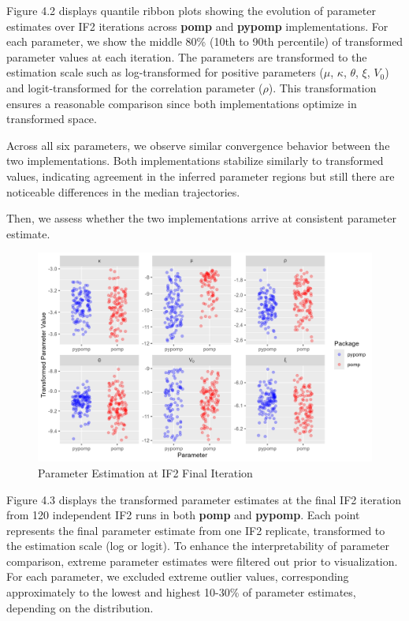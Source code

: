 \documentclass[11pt]{report}
\begin{document}
\newpage
Figure 4.2 displays quantile ribbon plots showing the evolution of parameter estimates over IF2 iterations across \textbf{pomp} and \textbf{pypomp} implementations. For each parameter, we show the middle 80\% (10th to 90th percentile) of transformed parameter values at each iteration.
The parameters are transformed to the estimation scale such as log-transformed for positive parameters ($\mu$, $\kappa$, $\theta$, $\xi$, $V_0$) and logit-transformed for the correlation parameter ($\rho$). This transformation ensures a reasonable comparison since both implementations optimize in transformed space. 

Across all six parameters, we observe similar convergence behavior between the two implementations. Both implementations stabilize similarly to transformed values, indicating agreement in the inferred parameter regions but still there are noticeable differences in the median trajectories. 

Then, we assess whether the two implementations arrive at consistent parameter estimate.
\begin{figure}[ht]
\begin{center}
\includegraphics[width=\textwidth]{param_final_iter_plot.png}
\end{center}
\caption{Parameter Estimation at IF2 Final Iteration}
\label{fig:if2paramtrace2}
\end{figure}

\newpage
Figure 4.3 displays the transformed parameter estimates at the final IF2 iteration from 120 independent IF2 runs in both \textbf{pomp} and \textbf{pypomp}. Each point represents the final parameter estimate from one IF2 replicate, transformed to the estimation scale (log or logit). To enhance the interpretability of parameter comparison, extreme parameter estimates were filtered out prior to visualization. For each parameter, we excluded extreme outlier values, corresponding approximately to the lowest and highest 10-30\% of parameter estimates, depending on the distribution. 
\end{document}
